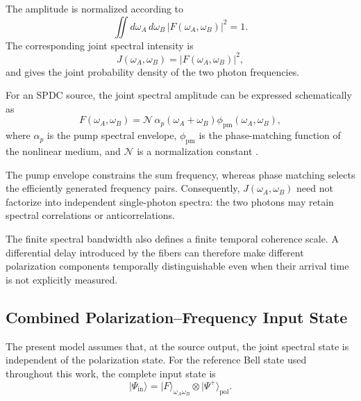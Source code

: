 The amplitude is normalized according to
%
\begin{equation}
    \iint
    d\omega_A\,d\omega_B\,
    |F(\omega_A,\omega_B)|^2
    =
    1.
    \label{eq:joint_spectral_amplitude_normalization}
\end{equation}
%
The corresponding joint spectral intensity is
%
\begin{equation}
    J(\omega_A,\omega_B)
    =
    |F(\omega_A,\omega_B)|^2,
    \label{eq:joint_spectral_intensity}
\end{equation}
%
and gives the joint probability density of the two photon frequencies.

For an SPDC source, the joint spectral amplitude can be expressed
schematically as
%
\begin{equation}
    F(\omega_A,\omega_B)
    =
    \mathcal{N}\,
    \alpha_p(\omega_A+\omega_B)
    \phi_{\mathrm{pm}}(\omega_A,\omega_B),
    \label{eq:spdc_jsa_pump_phase_matching}
\end{equation}
%
where \(\alpha_p\) is the pump spectral envelope,
\(\phi_{\mathrm{pm}}\) is the phase-matching function of the nonlinear
medium, and \(\mathcal{N}\) is a normalization constant
\cite{grice_walmsley_spdc_spectral_1997}.

The pump envelope constrains the sum frequency, whereas phase matching
selects the efficiently generated frequency pairs. Consequently,
\(J(\omega_A,\omega_B)\) need not factorize into independent single-photon
spectra: the two photons may retain spectral correlations or
anticorrelations.

The finite spectral bandwidth also defines a finite temporal coherence
scale. A differential delay introduced by the fibers can therefore make
different polarization components temporally distinguishable even when
their arrival time is not explicitly measured.


\subsection{Combined Polarization--Frequency Input State}
\label{subsec:combined_spdc_polarization_frequency_state}

The present model assumes that, at the source output, the joint spectral
state is independent of the polarization state. For the reference Bell state
used throughout this work, the complete input state is
%
\begin{equation}
    |\Psi_{\mathrm{in}}\rangle
    =
    |F\rangle_{\omega_A\omega_B}
    \otimes
    |\Psi^+\rangle_{\mathrm{pol}}.
    \label{eq:factorized_spdc_frequency_polarization_state}
\end{equation}

